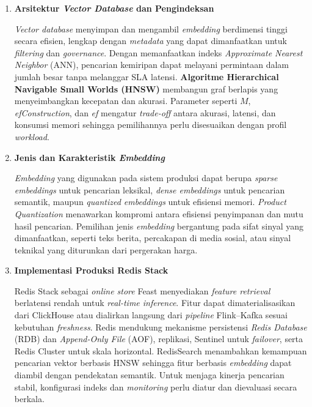 \begin{enumerate}
    \item \textbf{Arsitektur \textit{Vector Database} dan Pengindeksan}

    \textit{Vector database} menyimpan dan mengambil \textit{embedding} berdimensi tinggi secara efisien, lengkap dengan \textit{metadata} yang dapat dimanfaatkan untuk \textit{filtering} dan \textit{governance}. Dengan memanfaatkan indeks \textit{Approximate Nearest Neighbor} (ANN), pencarian kemiripan dapat melayani permintaan dalam jumlah besar tanpa melanggar SLA latensi. \textbf{Algoritme Hierarchical Navigable Small Worlds (HNSW)} \autocite{malkov2020efficient} membangun graf berlapis yang menyeimbangkan kecepatan dan akurasi. Parameter seperti $M$, \textit{efConstruction}, dan \textit{ef} mengatur \textit{trade-off} antara akurasi, latensi, dan konsumsi memori sehingga pemilihannya perlu disesuaikan dengan profil \textit{workload}.

    \item \textbf{Jenis dan Karakteristik \textit{Embedding}}

    \textit{Embedding} yang digunakan pada sistem produksi dapat berupa \textit{sparse embeddings} untuk pencarian leksikal, \textit{dense embeddings} untuk pencarian semantik, maupun \textit{quantized embeddings} untuk efisiensi memori. \textit{Product Quantization} \autocite{jegou2011product} menawarkan kompromi antara efisiensi penyimpanan dan mutu hasil pencarian. Pemilihan jenis \textit{embedding} bergantung pada sifat sinyal yang dimanfaatkan, seperti teks berita, percakapan di media sosial, atau sinyal teknikal yang diturunkan dari pergerakan harga.

    \item \textbf{Implementasi Produksi Redis Stack}

    Redis Stack sebagai \textit{online store} Feast menyediakan \textit{feature retrieval} berlatensi rendah untuk \textit{real-time inference}. Fitur dapat dimaterialisasikan dari ClickHouse atau dialirkan langsung dari \textit{pipeline} Flink--Kafka sesuai kebutuhan \textit{freshness}. Redis mendukung mekanisme persistensi \textit{Redis Database} (RDB) dan \textit{Append-Only File} (AOF), replikasi, Sentinel untuk \textit{failover}, serta Redis Cluster untuk skala horizontal. RedisSearch menambahkan kemampuan pencarian vektor berbasis HNSW sehingga fitur berbasis \textit{embedding} dapat diambil dengan pendekatan semantik. Untuk menjaga kinerja pencarian stabil, konfigurasi indeks dan \textit{monitoring} perlu diatur dan dievaluasi secara berkala.
\end{enumerate}


